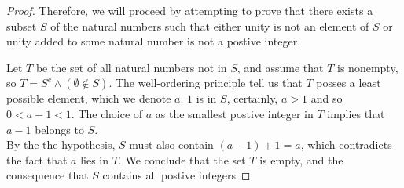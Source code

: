 \begin{definition}
\begin{proof}
    Therefore, we will proceed by attempting to prove that there exists a subset $S$ of the natural numbers such that either unity is not an element of $S$ or unity added to some natural number is not a postive integer. 

    Let $T$ be the set of all natural numbers not in $S$, and assume that $T$ is nonempty, so $T = S^c \wedge (\emptyset \notin S)$. The well-ordering principle tell us that $T$ posses a least possible element, which we denote $a$. $1$ is in $S$, certainly, $a > 1$ and so $0 < a-1 < 1$. The choice of $a$ as the smallest postive integer in $T$ implies that $a-1$ belongs to $S$. \\
    
    By the the hypothesis, $S$ must also contain $(a-1) + 1 = a$, which contradicts the fact that $a$ lies in $T$. We conclude that the set $T$ is empty, and the consequence that $S$ contains all postive integers  
\end{proof}

\end{definition}


